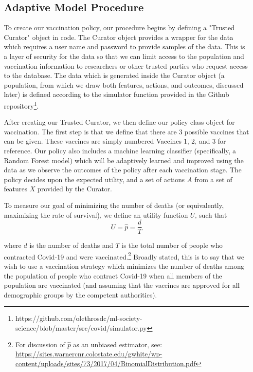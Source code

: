 \documentclass{article}
\begin{document}
\subsection{Adaptive Model Procedure}
\label{sec: Adaptive Procedure}

To create our vaccination policy, our procedure begins by defining a "Trusted Curator" object in code. The Curator object provides a wrapper for the data which requires a user name and password to provide samples of the data. This is a layer of security for the data so that we can limit access to the population and vaccination information to researchers or other trusted parties who request access to the database. The data which is generated inside the Curator object (a population, from which we draw both features, actions, and outcomes, discussed later) is defined according to the simulator function provided in the Github repository\footnote{https://github.com/olethrosdc/ml-society-science/blob/master/src/covid/simulator.py}.

After creating our Trusted Curator, we then define our policy class object for vaccination. The first step is that we define that there are $3$ possible vaccines that can be given. These vaccines are simply numbered Vaccines $1$, $2$, and $3$ for reference. Our policy also includes a machine learning classifier (specifically, a Random Forest model) which will be adaptively learned and improved using the data as we observe the outcomes of the policy after each vaccination stage. The policy decides upon the expected utility, and a set of actions $A$ from a set of features $X$ provided by the Curator.

To measure our goal of minimizing the number of deaths (or equivalently, maximizing the rate of survival), we define an utility function $U$, such that
\begin{equation}
\label{eq: utility}
    U = \hat{p} = \frac{d}{T}
\end{equation}

\noindent where $d$ is the number of deaths and $T$ is the total number of people who contracted Covid-19 and were vaccinated.\footnote{For discussion of $\hat{p}$ as an unbiased estimator, see: \url{https://sites.warnercnr.colostate.edu/gwhite/wp-content/uploads/sites/73/2017/04/BinomialDistribution.pdf}} Broadly stated, this is to say that we wish to use a vaccination strategy which minimizes the number of deaths among the population of people who contract Covid-19 when all members of the population are vaccinated (and assuming that the vaccines are approved for all demographic groups by the competent authorities). 
\end{document}
